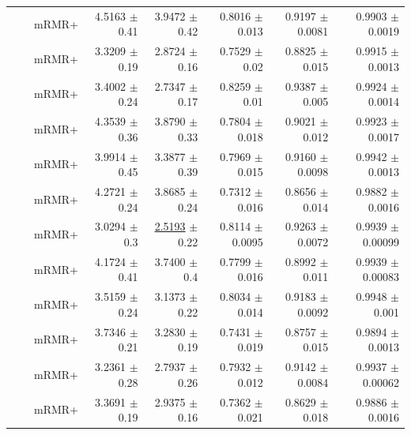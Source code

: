 \begin{longtable}{llp{}rrrrr}
 &  & mRMR+ & 4.5163 {\scriptsize $\pm$ 0.41} & 3.9472 {\scriptsize $\pm$ 0.42} & 0.8016 {\scriptsize $\pm$ 0.013} & 0.9197 {\scriptsize $\pm$ 0.0081} & 0.9903 {\scriptsize $\pm$ 0.0019} \\
 &  & mRMR+ & 3.3209 {\scriptsize $\pm$ 0.19} & 2.8724 {\scriptsize $\pm$ 0.16} & 0.7529 {\scriptsize $\pm$ 0.02} & 0.8825 {\scriptsize $\pm$ 0.015} & 0.9915 {\scriptsize $\pm$ 0.0013} \\
 &  & mRMR+ & 3.4002 {\scriptsize $\pm$ 0.24} & 2.7347 {\scriptsize $\pm$ 0.17} & 0.8259 {\scriptsize $\pm$ 0.01} & 0.9387 {\scriptsize $\pm$ 0.005} & 0.9924 {\scriptsize $\pm$ 0.0014} \\
 &  & mRMR+ & 4.3539 {\scriptsize $\pm$ 0.36} & 3.8790 {\scriptsize $\pm$ 0.33} & 0.7804 {\scriptsize $\pm$ 0.018} & 0.9021 {\scriptsize $\pm$ 0.012} & 0.9923 {\scriptsize $\pm$ 0.0017} \\
 &  & mRMR+ & 3.9914 {\scriptsize $\pm$ 0.45} & 3.3877 {\scriptsize $\pm$ 0.39} & 0.7969 {\scriptsize $\pm$ 0.015} & 0.9160 {\scriptsize $\pm$ 0.0098} & 0.9942 {\scriptsize $\pm$ 0.0013} \\
 &  & mRMR+ & 4.2721 {\scriptsize $\pm$ 0.24} & 3.8685 {\scriptsize $\pm$ 0.24} & 0.7312 {\scriptsize $\pm$ 0.016} & 0.8656 {\scriptsize $\pm$ 0.014} & 0.9882 {\scriptsize $\pm$ 0.0016} \\
 &  & mRMR+ & 3.0294 {\scriptsize $\pm$ 0.3} & \underline{2.5193} {\scriptsize $\pm$ 0.22} & 0.8114 {\scriptsize $\pm$ 0.0095} & 0.9263 {\scriptsize $\pm$ 0.0072} & 0.9939 {\scriptsize $\pm$ 0.00099} \\
 &  & mRMR+ & 4.1724 {\scriptsize $\pm$ 0.41} & 3.7400 {\scriptsize $\pm$ 0.4} & 0.7799 {\scriptsize $\pm$ 0.016} & 0.8992 {\scriptsize $\pm$ 0.011} & 0.9939 {\scriptsize $\pm$ 0.00083} \\
 &  & mRMR+ & 3.5159 {\scriptsize $\pm$ 0.24} & 3.1373 {\scriptsize $\pm$ 0.22} & 0.8034 {\scriptsize $\pm$ 0.014} & 0.9183 {\scriptsize $\pm$ 0.0092} & 0.9948 {\scriptsize $\pm$ 0.001} \\
 &  & mRMR+ & 3.7346 {\scriptsize $\pm$ 0.21} & 3.2830 {\scriptsize $\pm$ 0.19} & 0.7431 {\scriptsize $\pm$ 0.019} & 0.8757 {\scriptsize $\pm$ 0.015} & 0.9894 {\scriptsize $\pm$ 0.0013} \\
 &  & mRMR+ & 3.2361 {\scriptsize $\pm$ 0.28} & 2.7937 {\scriptsize $\pm$ 0.26} & 0.7932 {\scriptsize $\pm$ 0.012} & 0.9142 {\scriptsize $\pm$ 0.0084} & 0.9937 {\scriptsize $\pm$ 0.00062} \\
 &  & mRMR+ & 3.3691 {\scriptsize $\pm$ 0.19} & 2.9375 {\scriptsize $\pm$ 0.16} & 0.7362 {\scriptsize $\pm$ 0.021} & 0.8629 {\scriptsize $\pm$ 0.018} & 0.9886 {\scriptsize $\pm$ 0.0016} \\

\end{longtable}
